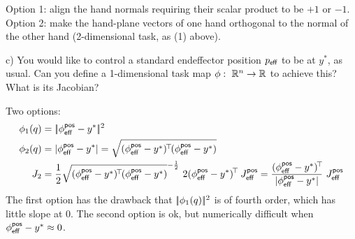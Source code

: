 \begin{solution}
Option 1: align the hand normals requiring their scalar product to be
$+1$ or $-1$. Option 2: make the hand-plane vectors of one hand
orthogonal to the normal of the other hand (2-dimensional task, as (1) above).
\end{solution}

c) You would like to control a standard endeffector position $p_{\textsf{eff}}$
to be at $y^*$, as usual. Can you define a 1-dimensional task map
$\phi:~ {\mathbb{R}}^n \to {\mathbb{R}}$ to achieve this? What is its Jacobian?

\begin{solution}
Two options:
\begin{align}
\phi_1(q)
&= \norm{\phi^\pos_\eff - y^*}^2 \\
\phi_2(q)
&= |\phi^\pos_\eff - y^*|
 = \sqrt{(\phi^\pos_\eff - y^*)^\T (\phi^\pos_\eff - y^*)} \\
J_2
&= \half \sqrt{(\phi^\pos_\eff - y^*)^\T (\phi^\pos_\eff -
 y^*)}^{-\half}~ 2 (\phi^\pos_\eff - y^*)^\T~ J^\pos_\eff 
 = \frac{(\phi^\pos_\eff - y^*)^\T}{|\phi^\pos_\eff - y^*|}~ J^\pos_\eff
\end{align}
The first option has the  drawback that $|\!|\phi_1(q)|\!|^2$
is of fourth order, which has little slope at 0. The second option is
ok, but numerically difficult when $\phi^{\textsf{pos}}_{\textsf{eff}} - y^* \approx 0$.
\end{solution}





